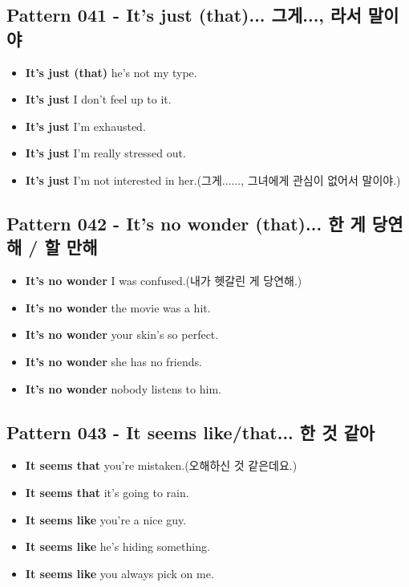 \documentclass[11pt]{oblivoir}
\begin{document}
\subsection{Pattern 041 - It's just (that)... 그게..., \texttildelow 라서 말이야}
\begin{itemize}
  \item \textbf{It's just (that)} he's not my type.
  \item \textbf{It's just} I don't feel up to it.
  \item \textbf{It's just} I'm exhausted.
  \item \textbf{It's just} I'm really stressed out.
  \item \textbf{It's just} I'm not interested in her.(그게......, 그녀에게 관심이 없어서 말이야.)
\end{itemize}

\subsection{Pattern 042 - It's no wonder (that)... \texttildelow 한 게 당연해 / \texttildelow 할 만해}
\begin{itemize}
  \item \textbf{It's no wonder} I was confused.(내가 헷갈린 게 당연해.)
  \item \textbf{It's no wonder} the movie was a hit.
  \item \textbf{It's no wonder} your skin's so perfect.
  \item \textbf{It's no wonder} she has no friends.
  \item \textbf{It's no wonder} nobody listens to him.
\end{itemize}

\subsection{Pattern 043 - It seems like/that... \texttildelow 한 것 같아}
\begin{itemize}
  \item \textbf{It seems that} you're mistaken.(오해하신 것 같은데요.)
  \item \textbf{It seems that} it's going to rain.
  \item \textbf{It seems like} you're a nice guy.
  \item \textbf{It seems like} he's hiding something.
  \item \textbf{It seems like} you always pick on me.
\end{itemize}
\end{document}
